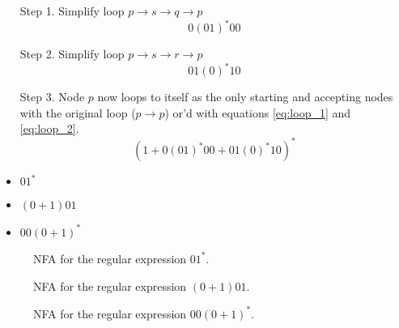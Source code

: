 \documentclass[12pt]{article}
\begin{document}
\begin{itemize}
    \item [Step 1.] Simplify loop $p \rightarrow s \rightarrow q \rightarrow p$
          \begin{equation}
              0(01)^*00
              \label{eq:loop_1}
          \end{equation}
    \item [Step 2.] Simplify loop $p \rightarrow s \rightarrow r \rightarrow p$
          \begin{equation}
              01(0)^*10
              \label{eq:loop_2}
          \end{equation}
    \item [Step 3.] Node $p$ now loops to itself as the only starting and
          accepting nodes with the original loop ($p \rightarrow p$) or'd with equations
          \ref{eq:loop_1} and \ref{eq:loop_2}.
          \begin{equation}
              (1 + 0(01)^*00 + 01(0)^*10)^*
          \end{equation}
\end{itemize}

\begin{itemize}
    \item $01^*$
    \item $(0+1)01$
    \item $00(0+1)^*$
\end{itemize}

\begin{figure}[ht]
    
    \caption{NFA for the regular expression $01^*$.}
\end{figure}

\begin{figure}[ht]
    
    \caption{NFA for the regular expression $(0+1)01$.}
\end{figure}

\begin{figure}[ht]
    
    \caption{NFA for the regular expression $00(0+1)^*$.}
\end{figure}
\end{document}
